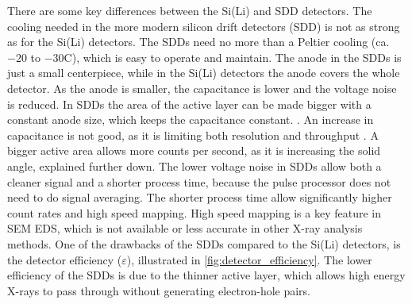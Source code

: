 There are some key differences between the Si(Li) and SDD detectors. %
The cooling needed in the more modern silicon drift detectors (SDD) is not as strong as for the Si(Li) detectors. %
The SDDs need no more than a Peltier cooling (ca.$ -20$ to $-30$\textdegree C), which is easy to operate and maintain.
The anode in the SDDs is just a small centerpiece, while in the Si(Li) detectors the anode covers the whole detector.
As the anode is smaller, the capacitance is lower and the voltage noise is reduced.
In SDDs the area of the active layer can be made bigger with a constant anode size, which keeps the capacitance constant. \cite{notaros_electromagnetics_2010}.
An increase in capacitance is not good, as it is limiting both resolution and throughput \cite[Ch. 16.3.9]{goldstein_scanning_2018}.
A bigger active area allows more counts per second, as it is increasing the solid angle, explained further down.
The lower voltage noise in SDDs allow both a cleaner signal and a shorter process time, because the pulse processor does not need to do signal averaging.
The shorter process time allow significantly higher count rates and high speed mapping.
High speed mapping is a key feature in SEM EDS, which is not available or less accurate in other X-ray analysis methods.
One of the drawbacks of the SDDs compared to the Si(Li) detectors, is the detector efficiency ($\varepsilon$), illustrated in \cref{fig:detector_efficiency}.
The lower efficiency of the SDDs is due to the thinner active layer, which allows high energy X-rays to pass through without generating electron-hole pairs.


